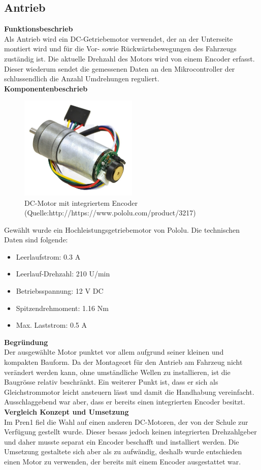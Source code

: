 \subsection{Antrieb}
\textbf{Funktionsbeschrieb}\\[0.2cm]
Als Antrieb wird ein DC-Getriebemotor verwendet, der an der Unterseite montiert wird und für die Vor- sowie Rückwärtsbewegungen des Fahrzeugs zuständig ist.
Die aktuelle Drehzahl des Motors wird von einem Encoder erfasst. Dieser wiederum sendet die gemessenen Daten an den Mikrocontroller der schlussendlich die Anzahl Umdrehungen reguliert.\\[0.2cm]
\textbf{Komponentenbeschrieb}
\begin{figure}[H]
\centering
\includegraphics[width=0.5\textwidth]{03_Loesungskonzept/pictures/Antrieb_Encoder.jpg}
\caption{DC-Motor mit integriertem Encoder (Quelle:http://https://www.pololu.com/product/3217)}	
\end{figure}
Gewählt wurde ein Hochleistungsgetriebemotor von Pololu.
Die technischen Daten sind folgende:
\begin{itemize}
\item Leerlaufstrom: 0.3 A
\item Leerlauf-Drehzahl: 210 U/min
\item Betriebsspannung: 12 V DC
\item Spitzendrehmoment: 1.16 Nm
\item Max. Laststrom: 0.5 A
\end{itemize}
\textbf{Begründung}\\[0.2cm]
Der ausgewählte Motor punktet vor allem aufgrund seiner kleinen und kompakten Bauform. Da der Montageort für den Antrieb am Fahrzeug nicht verändert werden kann, ohne umständliche Wellen zu installieren, ist die Baugrösse relativ beschränkt.
Ein weiterer Punkt ist, dass er sich als Gleichstrommotor leicht ansteuern lässt und damit die Handhabung vereinfacht. Ausschlaggebend war aber, dass er bereits einen integrierten Encoder besitzt.\\[0.2cm]
\textbf{Vergleich Konzept und Umsetzung}\\[0.2cm]
Im Pren1 fiel die Wahl auf einen anderen DC-Motoren, der von der Schule zur Verfügung gestellt wurde. Dieser besass jedoch keinen integrierten Drehzahlgeber und daher musste separat ein Encoder beschafft und installiert werden.
Die Umsetzung gestaltete sich aber als zu aufwändig, deshalb wurde entschieden einen Motor zu verwenden, der bereits mit einem Encoder ausgestattet war.
